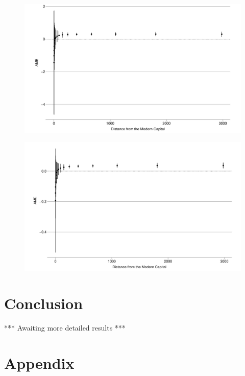 \documentclass[12pt]{article}
\begin{document}
\begin{figure}[htpb]
	\centering
	\includegraphics[width=\linewidth]{"../R/Output/deaths_int_plot.pdf"}
	\caption{}
	\label{deaths_int}
\end{figure}

\begin{figure}[htpb]
	\centering
	\includegraphics[width=\linewidth]{"../R/Output/state_based_int_plot.pdf"}
	\caption{}
	\label{sb_int}
\end{figure}

\section{Conclusion}

*** Awaiting more detailed results ***

\pagebreak




\pagebreak
\section*{Appendix}





\end{document}
